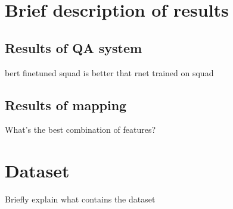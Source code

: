 \section{Brief description of results}
\label{sec:brief_results}

\subsection{Results of QA system}
bert finetuned squad is better that rnet trained on squad

\subsection{Results of mapping}
What's the best combination of features?

\section{Dataset}
Briefly explain what contains the dataset

